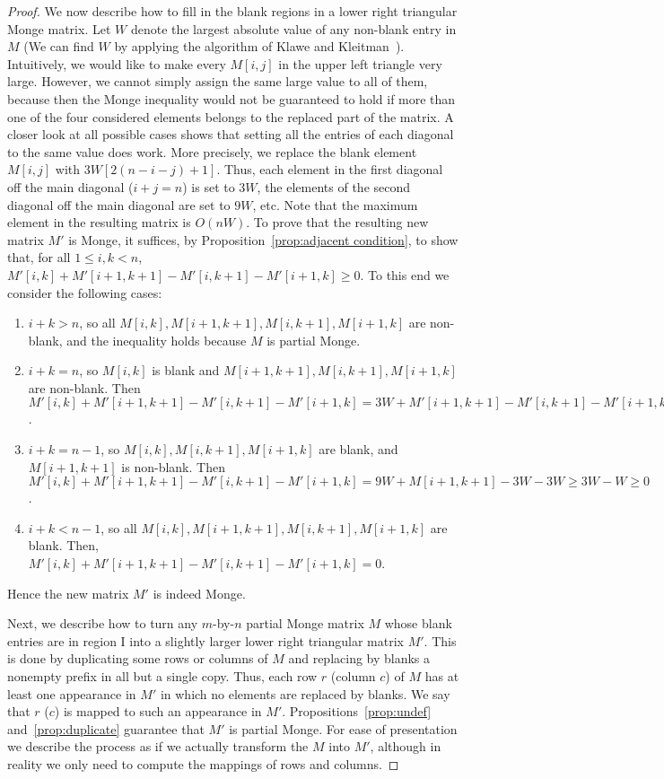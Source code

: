 \documentclass{llncs}
\begin{document}
\begin{proof}
We now describe how to fill in the blank regions in a lower right triangular Monge matrix. Let $W$ denote the largest absolute value of any non-blank entry in $M$ (We can find $W$ by applying the
algorithm of Klawe and Kleitman~\cite{KK89}). 
Intuitively, we would like to make every $M[i,j]$ in the upper left triangle very large. However,
we cannot simply assign the same large value to all of them, because then the Monge
inequality would not be guaranteed to hold if more than one of the four considered elements
belongs to the replaced part of the matrix. 
A closer look at all possible cases shows that setting all the entries of each diagonal to the same value does work. 
More precisely, we replace the blank element $M[i,j]$ with $3W[2(n-i-j)+1]$. Thus, each element in the first diagonal off the main diagonal ($i+j=n$) is set to $3W$, the elements of the second diagonal off the main diagonal are set to $9W$, etc. Note that the maximum element in the resulting matrix is $O(nW)$. 
To prove that the resulting new matrix $M'$ is Monge, it suffices, by Proposition~\ref{prop:adjacent condition}, to show that, for all $1\leq i,k < n$,  $M'[i,k]+M'[i+1,k+1]-M'[i,k+1]-M'[i+1,k] \geq 0$.
To this end we consider the following cases:
\begin{enumerate}
\item $i+k>n$, so all $M[i,k],M[i+1,k+1],M[i,k+1],M[i+1,k]$ are non-blank, and the inequality holds because $M$
is partial Monge.
\item $i+k=n$, so $M[i,k]$ is blank and $M[i+1,k+1],M[i,k+1],M[i+1,k]$ are non-blank. Then\\
$M'[i,k]+M'[i+1,k+1]-M'[i,k+1]-M'[i+1,k] = 3W + M'[i+1,k+1]-M'[i,k+1]-M'[i+1,k] \geq 3W-3W = 0$.
\item $i+k=n-1$, so $M[i,k],M[i,k+1],M[i+1,k]$ are blank, and $M[i+1,k+1]$ is non-blank. Then\\
$M'[i,k]+M'[i+1,k+1]-M'[i,k+1]-M'[i+1,k] = 9W + M[i+1,k+1] - 3W-3W \geq 3W - W \geq 0$.
\item $i+k<n-1$, so all $M[i,k],M[i+1,k+1],M[i,k+1],M[i+1,k]$ are blank. Then,\\ 
$M'[i,k]+M'[i+1,k+1]-M'[i,k+1]-M'[i+1,k] = 0$.
\end{enumerate}
Hence the new matrix $M'$ is indeed Monge.

Next, we describe how to turn any $m$-by-$n$ partial Monge matrix $M$ whose blank entries are in region I into a slightly larger lower right triangular matrix $M'$. This is done by duplicating some rows or columns of $M$ and replacing by blanks a nonempty prefix in all but a single copy. Thus, each row $r$ (column $c$) of $M$ has at least one appearance in $M'$ in which no elements are replaced by blanks. We say that $r$ ($c$) is mapped to such an appearance in $M'$.   Propositions~\ref{prop:undef} and~\ref{prop:duplicate} guarantee that $M'$ is partial Monge. 
For ease of presentation we describe the process as if we actually transform the $M$ into $M'$, although in reality we only need to compute the mappings of rows and columns. 


\end{proof}
\end{document}
